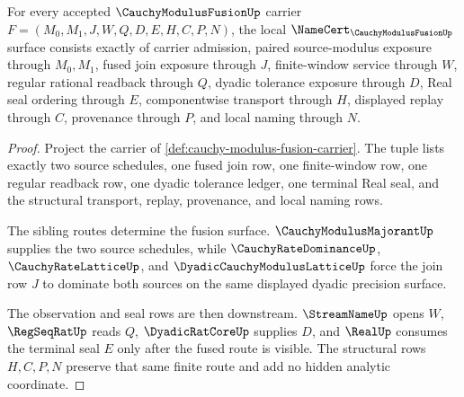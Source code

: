 \begin{theorem}
\label{thm:cauchy-modulus-fusion-namecert-obligations}
For every accepted $\CauchyModulusFusionUp$ carrier $F=(M_0,M_1,J,W,Q,D,E,H,C,P,N)$, the local $\NameCert_{\CauchyModulusFusionUp}$ surface consists exactly of carrier admission, paired source-modulus exposure through $M_0,M_1$, fused join exposure through $J$, finite-window service through $W$, regular rational readback through $Q$, dyadic tolerance exposure through $D$, Real seal ordering through $E$, componentwise transport through $H$, displayed replay through $C$, provenance through $P$, and local naming through $N$.
\end{theorem}
\begin{proof}
Project the carrier of \autoref{def:cauchy-modulus-fusion-carrier}. The tuple lists exactly two source schedules, one fused join row, one finite-window row, one regular readback row, one dyadic tolerance ledger, one terminal Real seal, and the structural transport, replay, provenance, and local naming rows.

The sibling routes determine the fusion surface. $\CauchyModulusMajorantUp$ supplies the two source schedules, while $\CauchyRateDominanceUp$, $\CauchyRateLatticeUp$, and $\DyadicCauchyModulusLatticeUp$ force the join row $J$ to dominate both sources on the same displayed dyadic precision surface.

The observation and seal rows are then downstream. $\StreamNameUp$ opens $W$, $\RegSeqRatUp$ reads $Q$, $\DyadicRatCoreUp$ supplies $D$, and $\RealUp$ consumes the terminal seal $E$ only after the fused route is visible. The structural rows $H,C,P,N$ preserve that same finite route and add no hidden analytic coordinate.
\end{proof}

